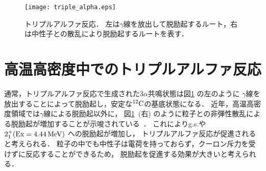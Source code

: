 \documentclass[../master]{subfiles}
\begin{document}
\begin{figure}
  \centering
  \texttt{[image: triple\_alpha.eps]}
  \caption[トリプルアルファ反応．]{トリプルアルファ反応．
    左は$\gamma$線を放出して脱励起するルート，右は中性子との散乱により脱励起するルートを表す．}
  \label{fig::triple_alpha}
\end{figure}

\section{高温高密度中でのトリプルアルファ反応}
\label{seq::triplealphareaction}
通常，トリプルアルファ反応で生成された$3\alpha$共鳴状態は図\ref{fig::triple_alpha} の左のように
$\gamma$線を放出することによって脱励起し，安定な${}^{12}{\rm C}$の基底状態になる．
近年，高温高密度領域では$\gamma$線による脱励起以外に，
図\ref{fig::triple_alpha}~(右) のように粒子との非弾性散乱による脱励起が増加することが示唆されている~\cite{hotdensemedium}．
これによりg.s.や$2_{1}^{+} ({\rm Ex} = \SI{4.44}{\mega\electronvolt})$ への脱励起が増加し，
トリプルアルファ反応が促進されると考えられる．
粒子の中でも中性子は電荷を持っておらず，クーロン斥力を受けずに反応することができるため，
脱励起を促進する効果が大きいと考えられる．


\end{document}
